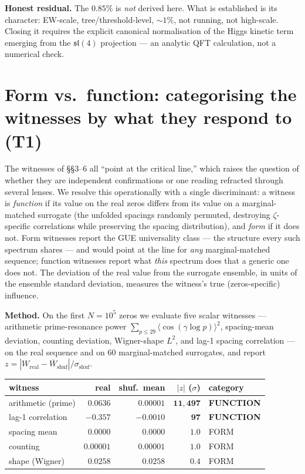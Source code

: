 \documentclass[11pt]{article}
\begin{document}
\textbf{Honest residual.} The $0.85\%$ is \emph{not} derived here. What is established is its character: EW-scale, tree/threshold-level, $\sim1\%$, not running, not high-scale. Closing it requires the explicit canonical normalisation of the Higgs kinetic term emerging from the $\mathfrak{sl}(4)$ projection --- an analytic QFT calculation, not a numerical check.

\section{Form vs.\ function: categorising the witnesses by what they respond to (T1)}

The witnesses of \S\S3--6 all ``point at the critical line,'' which raises the question of whether they are independent confirmations or one reading refracted through several lenses. We resolve this operationally with a single discriminant: a witness is \emph{function} if its value on the real zeros differs from its value on a marginal-matched surrogate (the unfolded spacings randomly permuted, destroying $\zeta$-specific correlations while preserving the spacing distribution), and \emph{form} if it does not. Form witnesses report the GUE universality class --- the structure every such spectrum shares --- and would point at the line for \emph{any} marginal-matched sequence; function witnesses report what \emph{this} spectrum does that a generic one does not. The deviation of the real value from the surrogate ensemble, in units of the ensemble standard deviation, measures the witness's true (zeros-specific) influence.

\textbf{Method.} On the first $N=10^5$ zeros we evaluate five scalar witnesses --- arithmetic prime-resonance power $\sum_{p\le29}\langle\cos(\gamma\log p)\rangle^2$, spacing-mean deviation, counting deviation, Wigner-shape $L^2$, and lag-1 spacing correlation --- on the real sequence and on $60$ marginal-matched surrogates, and report $z=|W_{\mathrm{real}}-\overline{W}_{\mathrm{shuf}}|/\sigma_{\mathrm{shuf}}$.

\begin{center}\small
\begin{tabular}{lrrrl}
\hline
witness & real & shuf.\ mean & $|z|$ ($\sigma$) & category \\
\hline
arithmetic (prime) & $0.0636$ & $0.00001$ & $\mathbf{11{,}497}$ & \textbf{FUNCTION} \\
lag-1 correlation & $-0.357$ & $-0.0010$ & $\mathbf{97}$ & \textbf{FUNCTION} \\
spacing mean & $0.0000$ & $0.0000$ & $1.0$ & FORM \\
counting & $0.00001$ & $0.00001$ & $1.0$ & FORM \\
shape (Wigner) & $0.0258$ & $0.0258$ & $0.4$ & FORM \\
\hline
\end{tabular}
\end{center}
\end{document}

